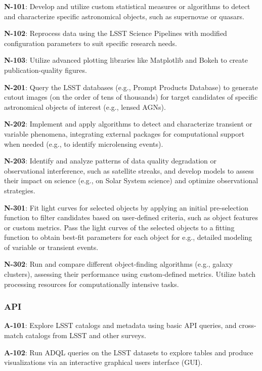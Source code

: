 \textbf{N-101}: Develop and utilize custom statistical measures or algorithms to detect and characterize specific astronomical objects, such as supernovae or quasars.

\textbf{N-102}: Reprocess data using the LSST Science Pipelines with modified configuration parameters to suit specific research needs.

\textbf{N-103}: Utilize advanced plotting libraries like Matplotlib and Bokeh to create publication-quality figures.

\textbf{N-201}: Query the LSST databases (e.g., Prompt Products Database) to generate cutout images (on the order of tens of thousands) for target candidates of specific astronomical objects of interest (e.g., lensed AGNs).

\textbf{N-202}: Implement and apply algorithms to detect and characterize transient or variable phenomena, integrating external packages for computational support when needed (e.g., to identify microlensing events).

\textbf{N-203}: Identify and analyze patterns of data quality degradation or observational interference, such as satellite streaks, and develop models to assess their impact on science (e.g., on Solar System science) and optimize observational strategies.

\textbf{N-301}: Fit light curves for selected objects by applying an initial pre-selection function to filter candidates based on user-defined criteria, such as object features or custom metrics.
Pass the light curves of the selected objects to a fitting function to obtain best-fit parameters for each object for e.g.,  detailed modeling of variable or transient events. 

\textbf{N-302}: Run and compare different object-finding algorithms (e.g., galaxy clusters), assessing their performance using custom-defined metrics. Utilize batch processing resources for computationally intensive tasks.

\subsubsection{API}

\textbf{A-101}: Explore LSST catalogs and metadata using basic API queries, and cross-match catalogs from LSST and other surveys.

\textbf{A-102}: Run ADQL queries on the LSST datasets to explore tables and produce visualizations via an interactive graphical users interface (GUI).

